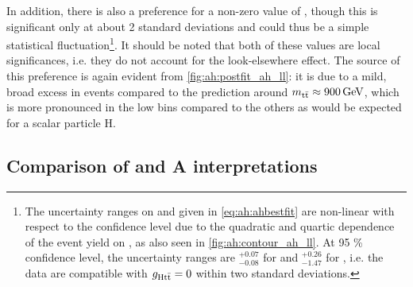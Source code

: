 In addition, there is also a preference for a non-zero value of \gHtt, though this is significant only at about 2 standard deviations and could thus be a simple statistical fluctuation\footnote{The uncertainty ranges on \gAtt and \gHtt given in \cref{eq:ah:ahbestfit} are non-linear with respect to the confidence level due to the quadratic and quartic dependence of the event yield on \gAHtt, as also seen in \cref{fig:ah:contour_ah_ll}. At 95 \% confidence level, the uncertainty ranges are ${}^{+0.07}_{-0.08}$ for \gAtt and ${}^{+0.26}_{-1.47}$ for \gHtt, i.e. the data are compatible with $g_{\mathrm{H t \bar{t}}} = 0$ within two standard deviations.}. It should be noted that both of these values are local significances, i.e. they do not account for the look-elsewhere effect. The source of this preference is again evident from \cref{fig:ah:postfit_ah_ll}: it is due to a mild, broad excess in events compared to the prediction around $\mtt \approx \SI{900}{\GeV}$, which is more pronounced in the low \chan bins compared to the others as would be expected for a scalar particle H.



% 


\subsection{Comparison of \texorpdfstring{\etat}{EtaT} and A interpretations}
\label{sec:ah:AvsEtaT}

